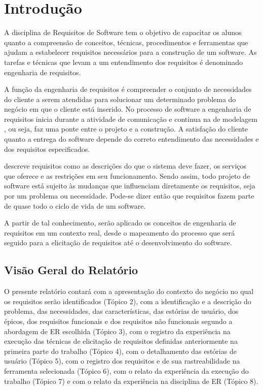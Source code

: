 \chapter{Introdução}

A disciplina de Requisitos de Software tem o objetivo de capacitar os alunos
quanto a compreensão de conceitos, técnicas, procedimentos e ferramentas que
ajudam a estabelecer requisitos necessários para a construção de um software.
As tarefas e técnicas que levam a um entendimento dos requisitos é denominado
engenharia de requisitos.

A função da engenharia de requisitos é compreender o conjunto de necessidades do
cliente a serem atendidas para solucionar um determinado problema do negócio em
que o cliente está inserido. No processo de software a engenharia de requisitos
inicia durante a atividade de comunicação e continua na de modelagem
\cite{pressman2016engenharia}, ou seja, faz uma ponte entre o projeto e a
construção. A satisfação do cliente quanto a entrega do software depende do
correto entendimento das necessidades e dos requisitos especificados.

\cite{sommerville2011engenharia} descreve requisitos como as descrições do que o
sistema deve fazer, os serviços que oferece e as restrições em seu
funcionamento. Sendo assim, todo projeto de software está sujeito às mudanças
que influenciam diretamente os requisitos, seja por um problema ou necessidade.
Pode-se dizer então que requisitos fazem parte de quase todo o ciclo de vida de
um software.

A partir de tal conhecimento, serão aplicado os conceitos de engenharia de
requisitos em um contexto real, desde o mapeamento do processo que será seguido
para a elicitação de requisitos até o desenvolvimento do software.

\section{Visão Geral do Relatório}

O presente relatório contará com a apresentação do contexto do negócio no qual
os requisitos serão identificados (Tópico 2), com a identificação e a descrição
do problema, das necessidades, das características, das estórias de usuário, dos
épicos, dos requisitos funcionais e dos requisitos não funcionais segundo a
abordagem de ER escolhida (Tópico 3), com o registro da experiência na execução
das técnicas de elicitação de requisitos definidas anteriormente na primeira
parte do trabalho (Tópico 4), com o detalhamento das estórias de usuário (Tópico
5), com o registro dos requisitos e de sua rastreabilidade na ferramenta
selecionada (Tópico 6), com o relato da experiência da execução do trabalho
(Tópico 7) e com o relato da experiência na disciplina de ER (Tópico 8).
